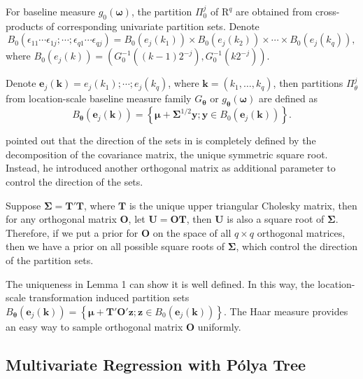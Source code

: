 \documentclass[12pt]{article}
\newcommand{\polya}{P\'{o}lya}
\begin{document}
For baseline measure $g_0(\bm{\omega})$, the partition $\Pi_0^j$ of
$\mathrm{R}^q$ are obtained from cross-products of corresponding
univariate partition sets. Denote
$$B_0( \epsilon_{11}\cdots
\epsilon_{1j};\cdots;\epsilon_{q1}\cdots\epsilon_{qj}) = B_0(e_j(k_1))
\times B_0(e_j(k_2)) \times \cdots \times B_0(e_j(k_q)),$$ where
$B_0(e_j(k))= \left( G_0^{-1}((k-1)2^{-j}), G_0^{-1}(k2^{-j})
\right)$.

Denote $\bm{e}_j(\bm{k})= e_j(k_1); \cdots;e_j(k_q)$, where $\bm{k}=
(k_1, \ldots, k_q)$, then partitions $\Pi_{\theta}^j$ from
location-scale baseline measure family $G_{\bm{\theta}}$ or
$g_{\bm{\theta}}(\bm{\omega})$ are defined as
\begin{displaymath}
  B_{\bm{\theta}}(\bm{e}_j(\bm{k})) = \left\{ \bm{\mu} +
    \bm{\Sigma}^{1/2} \bm{y}; \bm{y} \in B_0(\bm{e}_j(\bm{k})) \right\}.
\end{displaymath}

\citet{jara2009} pointed out that the direction of the sets in
\citet{hanson2006} is completely defined by the decomposition of the
covariance matrix, the unique symmetric square root. Instead, he
introduced another orthogonal matrix as additional parameter to
control the direction of the sets.

Suppose $\bm{\Sigma} = \bm{T'T}$, where $\bm{T}$ is the unique upper
triangular Cholesky matrix, then for any orthogonal matrix $\bm{O}$,
let $\bm{U=OT}$, then $\bm{U}$ is also a square root of
$\bm{\Sigma}$. Therefore, if we put a prior for $\bm{O}$ on the space
of all $q \times q$ orthogonal matrices, then we have a prior on all
possible square roots of $\bm{\Sigma}$, which control the direction of
the partition sets.

The uniqueness in Lemma 1 \citep{jara2009} can show it is well
defined. In this way, the location-scale transformation induced
partition sets $B_{\bm{\theta}}(\bm{e}_j(\bm{k})) = \left\{ \bm{\mu} +
  \bm{T'O'} \bm{z}; \bm{z} \in B_0(\bm{e}_j(\bm{k})) \right\}.$ The
Haar measure \citep{halmos1950} provides an easy way to sample
orthogonal matrix $\bm{O}$ uniformly.

\subsection{Multivariate Regression with \polya{} Tree}
\end{document}
